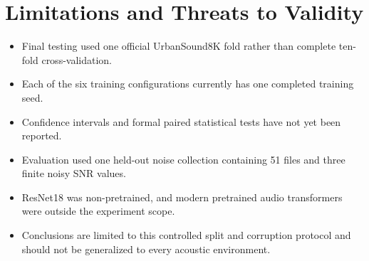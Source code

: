 \section{Limitations and Threats to Validity}

\begin{itemize}
  \item Final testing used one official UrbanSound8K fold rather than complete
  ten-fold cross-validation.
  \item Each of the six training configurations currently has one completed
  training seed.
  \item Confidence intervals and formal paired statistical tests have not yet
  been reported.
  \item Evaluation used one held-out noise collection containing 51 files and
  three finite noisy SNR values.
  \item ResNet18 was non-pretrained, and modern pretrained audio transformers
  were outside the experiment scope.
  \item Conclusions are limited to this controlled split and corruption
  protocol and should not be generalized to every acoustic environment.
\end{itemize}
